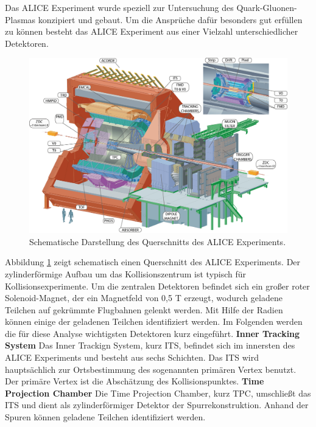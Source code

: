 Das ALICE Experiment wurde speziell zur Untersuchung des Quark-Gluonen-Plasmas konzipiert und gebaut.
Um die Anspr\"uche daf\"ur besonders gut erf\"ullen zu k\"onnen besteht das ALICE Experiment aus einer Vielzahl unterschiedlicher Detektoren.
\begin{figure}[thp]
\centering
\includegraphics[width=.9\linewidth]{ALICE.jpg}
\caption{Schematische Darstellung des Querschnitts des ALICE Experiments.
\cite{WEBSITE:1}}
\label{fig:ALICE}
\end{figure}
Abbildung \ref{fig:ALICE} zeigt schematisch einen Querschnitt des ALICE Experiments. Der zylinderf\"ormige Aufbau um das Kollisionszentrum ist typisch f\"ur Kollisionsexperimente.
\newline
Um die zentralen Detektoren befindet sich ein gro{\ss}er roter Solenoid-Magnet, der ein Magnetfeld von 0,5 T erzeugt, wodurch geladene Teilchen auf gekr\"ummte Flugbahnen gelenkt werden.
Mit Hilfe der Radien k\"onnen einige der geladenen Teilchen identifiziert werden.
Im Folgenden werden die f\"ur diese Analyse wichtigsten Detektoren kurz eingef\"uhrt.
\newline
\textbf{Inner Tracking System}
\newline
Das Inner Trackign System, kurz ITS, befindet sich im innersten des ALICE Experiments und besteht aus sechs Schichten.
Das ITS wird haupts\"achlich zur Ortsbestimmung des sogenannten prim\"aren Vertex benutzt.
Der prim\"are Vertex ist die Absch\"atzung des Kollisionspunktes.
\newline
\textbf{Time Projection Chamber}
\newline
Die Time Projection Chamber, kurz TPC, umschlie{\ss}t das ITS und dient als zylinderf\"ormiger Detektor der Spurrekonstruktion.
Anhand der Spuren k\"onnen geladene Teilchen identifiziert werden.
